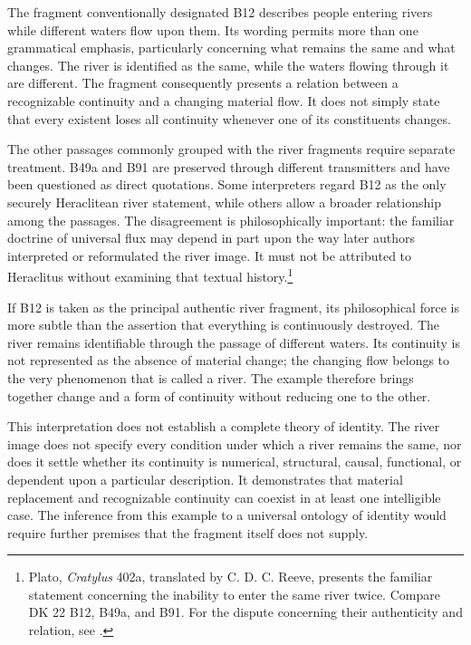 The fragment conventionally designated B12 describes
people entering rivers while different waters flow upon
them. Its wording permits more than one grammatical
emphasis, particularly concerning what remains the same
and what changes. The river is identified as the same,
while the waters flowing through it are different. The
fragment consequently presents a relation between a
recognizable continuity and a changing material flow.
It does not simply state that every existent loses all
continuity whenever one of its constituents changes.

\label{para:VS.B01.P01.C08.S03.SS03.P003}

The other passages commonly grouped with the river
fragments require separate treatment. B49a and B91 are
preserved through different transmitters and have been
questioned as direct quotations. Some interpreters regard
B12 as the only securely Heraclitean river statement,
while others allow a broader relationship among the
passages. The disagreement is philosophically important:
the familiar doctrine of universal flux may depend in
part upon the way later authors interpreted or reformulated
the river image. It must not be attributed to Heraclitus
without examining that textual history.\footnote{Plato,
\textit{Cratylus} 402a, translated by C. D. C. Reeve,
presents the familiar statement concerning the inability
to enter the same river twice. Compare DK 22 B12, B49a,
and B91. For the dispute concerning their authenticity
and relation, see \cite{PlatoCratylus,
HeraclitusFragments,KirkHeraclitus1954,
GrahamHeraclitusSEP2023}.}

\label{para:VS.B01.P01.C08.S03.SS03.P004}

If B12 is taken as the principal authentic river fragment,
its philosophical force is more subtle than the assertion
that everything is continuously destroyed. The river
remains identifiable through the passage of different
waters. Its continuity is not represented as the absence
of material change; the changing flow belongs to the
very phenomenon that is called a river. The example
therefore brings together change and a form of continuity
without reducing one to the other.

\label{para:VS.B01.P01.C08.S03.SS03.P005}

This interpretation does not establish a complete theory
of identity. The river image does not specify every
condition under which a river remains the same, nor
does it settle whether its continuity is numerical,
structural, causal, functional, or dependent upon a
particular description. It demonstrates that material
replacement and recognizable continuity can coexist
in at least one intelligible case. The inference from
this example to a universal ontology of identity would
require further premises that the fragment itself does
not supply.

